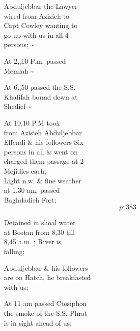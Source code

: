 \documentclass{report}
\begin{document}
	\par{
 	Abduljebbar the Lawyer\ \\wired from Azizieh to\ \\Capt Cowley wanting to\ \\go up with us in all 4\ \\persons; \~{}\ \\
	}

	\par{
 	At 2,,10 P.m. passed\ \\Memlah \~{}\ \\
	}

	\par{
 	At 6,,50 passed the S.S.\ \\Khalifah bound down at\ \\Shedief \~{}\ \\
	}

	\par{
 	At 10,10 P.M took\ \\from Azisieh Abduljebbar\ \\Effendi \& his followers Six\ \\persons in all \& went on\ \\charged them passage at 2\ \\Mejidies each;\ \\Light n.w. \& fine weather\ \\at 1,30 am. passed\ \\Baghdadieh Fort;\ \\
  \[p: 383 \]

	}



	\par{
 	Detained in shoal water\ \\at Bostan from 8,30 till\ \\8,45 a.m. ; River is\ \\falling;\ \\
	}

	\par{
 	Abduljebbar \& his followers\ \\are on Hatch, he breakfasted\ \\with us;\ \\
	}

	\par{
 	At 11 am passed Ctesiphon\ \\the smoke of the S.S. Phrat\ \\is in sight ahead of us;\ \\
	}
\end{document}
